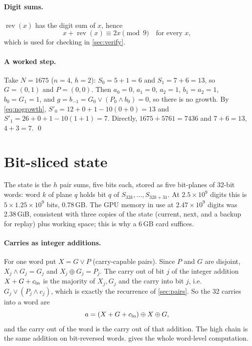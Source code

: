 \documentclass[11pt,a4paper]{article}
\newcommand{\rev}{\operatorname{rev}}
\newcommand{\xor}{\oplus}
\newcommand{\gen}{G}
\newcommand{\prop}{P}
\theoremstyle{remark}
\begin{document}
\paragraph{Digit sums.}
$\rev(x)$ has the digit sum of $x$, hence
\begin{equation}\label{eq:mod9}
x+\rev(x)\equiv 2x\pmod 9\quad\text{for every }x,
\end{equation}
which is used for checking in \cref{sec:verify}.

\paragraph{A worked step.}
Take $N=1675$ ($n=4$, $h=2$): $S_0=5+1=6$ and $S_1=7+6=13$, so $\gen=(0,1)$ and $\prop=(0,0)$. Then $a_0=0$, $a_1=0$, $a_2=1$, $b_1=a_2=1$, $b_0=\gen_1=1$, and $g=b_{-1}=\gen_0\lor(\prop_0\land b_0)=0$, so there is no growth. By \eqref{eq:nogrowth}, $S'_0=12+0+1-10(0+0)=13$ and $S'_1=26+0+1-10(1+1)=7$. Directly, $1675+5761=7436$ and $7+6=13$, $4+3=7$. \qed

\section{Bit-sliced state}\label{sec:bits}

The state is the $h$ pair sums, five bits each, stored as five bit-planes of 32-bit words: word $k$ of plane $q$ holds bit $q$ of $S_{32k},\dots,S_{32k+31}$. At $2.5\times10^9$ digits this is $5\times1.25\times10^9$ bits, $0.78$\,GB. The GPU memory in use at $2.47\times10^9$ digits was $2.38$\,GiB, consistent with three copies of the state (current, next, and a backup for replay) plus working space; this is why a 6\,GB card suffices.

\paragraph{Carries as integer additions.}
For one word put $X=\gen\lor\prop$ (carry-capable pairs). Since $\prop$ and $\gen$ are disjoint, $X_j\land\gen_j=\gen_j$ and $X_j\xor\gen_j=\prop_j$. The carry out of bit $j$ of the integer addition $X+\gen+c_{\rm in}$ is the majority of $X_j,\gen_j$ and the carry into bit $j$, i.e.\ $\gen_j\lor(\prop_j\land c_j)$, which is exactly the recurrence of \cref{sec:pairs}. So the 32 carries into a word are
\begin{equation}
a=(X+\gen+c_{\rm in})\xor X\xor\gen,
\end{equation}
and the carry out of the word is the carry out of that addition. The high chain is the same addition on bit-reversed words.  gives the whole word-level computation.
\end{document}
